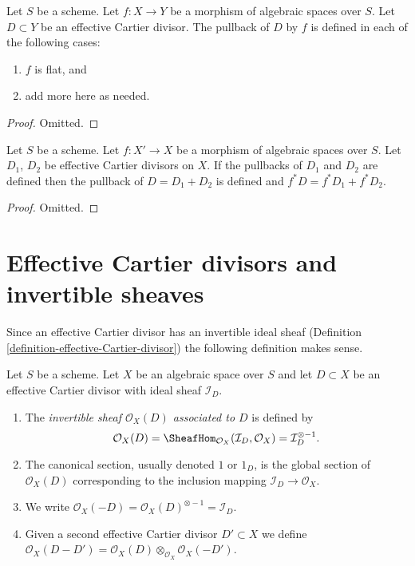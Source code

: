 \begin{lemma}
\label{lemma-pullback-effective-Cartier-defined}
Let $S$ be a scheme.
Let $f : X \to Y$ be a morphism of algebraic spaces over $S$.
Let $D \subset Y$ be an effective Cartier divisor.
The pullback of $D$ by $f$ is defined in each of the following cases:
\begin{enumerate}
\item $f$ is flat, and
\item add more here as needed.
\end{enumerate}
\end{lemma}

\begin{proof}
Omitted.
\end{proof}

\begin{lemma}
\label{lemma-pullback-effective-Cartier-divisors-additive}
Let $S$ be a scheme.
Let $f : X' \to X$ be a morphism of algebraic spaces over $S$.
Let $D_1$, $D_2$ be effective Cartier divisors on $X$.
If the pullbacks of $D_1$ and $D_2$ are defined then the
pullback of $D = D_1 + D_2$ is defined and
$f^*D = f^*D_1 + f^*D_2$.
\end{lemma}

\begin{proof}
Omitted.
\end{proof}




\section{Effective Cartier divisors and invertible sheaves}
\label{section-effective-Cartier-invertible}

\noindent
Since an effective Cartier divisor has an invertible ideal sheaf
(Definition \ref{definition-effective-Cartier-divisor}) the
following definition makes sense.

\begin{definition}
\label{definition-invertible-sheaf-effective-Cartier-divisor}
Let $S$ be a scheme. Let $X$ be an algebraic space over $S$
and let $D \subset X$ be an effective Cartier divisor with ideal
sheaf $\mathcal{I}_D$.
\begin{enumerate}
\item The {\it invertible sheaf $\mathcal{O}_X(D)$ associated to $D$}
is defined by
$$
\mathcal{O}_X(D) =
\SheafHom_{\mathcal{O}_X}(\mathcal{I}_D, \mathcal{O}_X) =
\mathcal{I}_D^{\otimes -1}.
$$
\item The canonical section, usually denoted $1$ or $1_D$, is the
global section of $\mathcal{O}_X(D)$ corresponding to
the inclusion mapping $\mathcal{I}_D \to \mathcal{O}_X$.
\item We write
$\mathcal{O}_X(-D) = \mathcal{O}_X(D)^{\otimes -1} = \mathcal{I}_D$.
\item Given a second effective Cartier divisor $D' \subset X$ we define
$\mathcal{O}_X(D - D') =
\mathcal{O}_X(D) \otimes_{\mathcal{O}_X} \mathcal{O}_X(-D')$.
\end{enumerate}
\end{definition}

